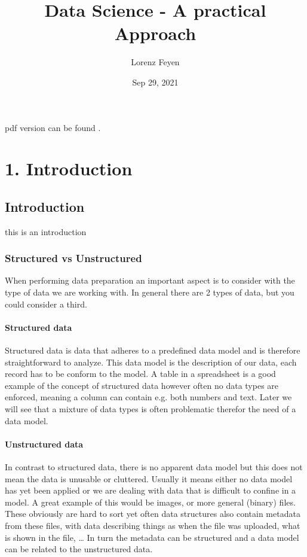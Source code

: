 \documentclass[letterpaper,10pt,english]{jupyterBook}
\title{Data Science - A practical Approach}
\date{Sep 29, 2021}
\author{Lorenz Feyen}
\begin{document}
\pagestyle{empty}
\sphinxmaketitle
\pagestyle{plain}
\sphinxtableofcontents
\pagestyle{normal}
\label{\detokenize{foreword::doc}}


\sphinxAtStartPar
pdf version can be found .


\part{1. Introduction}


\chapter{Introduction}
\label{\detokenize{c1_introduction/introduction:introduction}}\label{\detokenize{c1_introduction/introduction::doc}}
\sphinxAtStartPar
this is an introduction


\section{Structured vs Unstructured}
\label{\detokenize{c1_introduction/introduction:structured-vs-unstructured}}
\sphinxAtStartPar
When performing data preparation an important aspect is to consider with the type of data we are working with.
In general there are 2 types of data, but you could consider a third.


\subsection{Structured data}
\label{\detokenize{c1_introduction/introduction:structured-data}}
\sphinxAtStartPar
Structured data is data that adheres to a pre\sphinxhyphen{}defined data model and is therefore straightforward to analyze.
This data model is the description of our data, each record has to be conform to the model.
A table in a spreadsheet is a good example of the concept of structured data however often no data types are enforced, meaning a column can contain e.g. both numbers and text.
Later we will see that a mixture of data types is often problematic therefor the need of a data model.


\subsection{Unstructured data}
\label{\detokenize{c1_introduction/introduction:unstructured-data}}
\sphinxAtStartPar
In contrast to structured data, there is no apparent data model but this does not mean the data is unusable or cluttered.
Usually it means either no data model has yet been applied or we are dealing with data that is difficult to confine in a model.
A great example of this would be images, or more general (binary) files.
These obviously are hard to sort yet often data structures also contain metadata from these files, with data describing things as when the file was uploaded, what is shown in the file, …
In turn the metadata can be structured and a data model can be related to the unstructured data.
\end{document}
